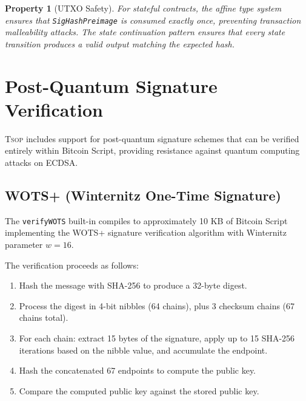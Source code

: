 \documentclass[11pt,a4paper]{article}
\newtheorem{property}[theorem]{Property}
\newcommand{\tsop}{\textsc{Tsop}}
\begin{document}
\begin{property}[UTXO Safety]
\label{prop:utxo-safety}
For stateful contracts, the affine type system ensures that
\texttt{SigHashPreimage} is consumed exactly once, preventing transaction
malleability attacks. The state continuation pattern ensures that every
state transition produces a valid output matching the expected hash.
\end{property}

\section{Post-Quantum Signature Verification}
\label{sec:pq}

\tsop{} includes support for post-quantum signature schemes that can be
verified entirely within Bitcoin Script, providing resistance against
quantum computing attacks on ECDSA.

\subsection{WOTS+ (Winternitz One-Time Signature)}
\label{sec:wots}

The \texttt{verifyWOTS} built-in compiles to approximately 10 KB of Bitcoin
Script implementing the WOTS+ signature verification algorithm with
Winternitz parameter $w = 16$.

The verification proceeds as follows:
\begin{enumerate}[nosep]
  \item Hash the message with SHA-256 to produce a 32-byte digest.
  \item Process the digest in 4-bit nibbles (64 chains), plus 3 checksum
    chains (67 chains total).
  \item For each chain: extract 15 bytes of the signature, apply up to 15
    SHA-256 iterations based on the nibble value, and accumulate the endpoint.
  \item Hash the concatenated 67 endpoints to compute the public key.
  \item Compare the computed public key against the stored public key.
\end{enumerate}
\end{document}
